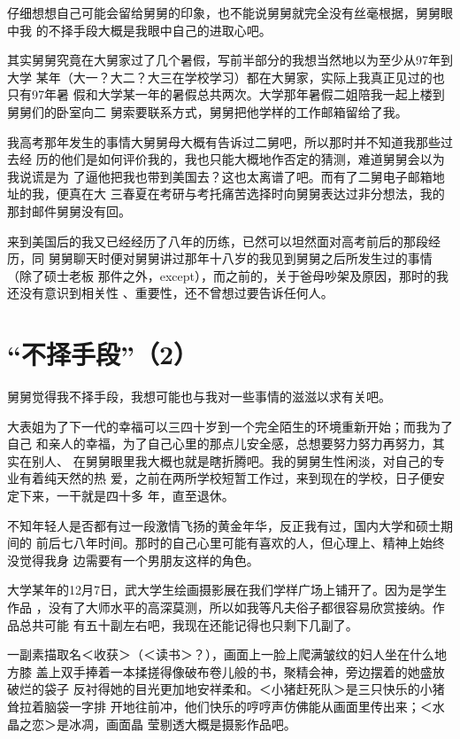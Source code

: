 \documentclass[12pt]{book}
\begin{document}
仔细想想自己可能会留给舅舅的印象，也不能说舅舅就完全没有丝毫根据，舅舅眼中我
的不择手段大概是我眼中自己的进取心吧。

其实舅舅究竟在大舅家过了几个暑假，写前半部分的我想当然地以为至少从97年到大学
某年（大一？大二？大三在学校学习）都在大舅家，实际上我真正见过的也只有97年暑
假和大学某一年的暑假总共两次。大学那年暑假二姐陪我一起上楼到舅舅们的卧室向二
舅索要联系方式，舅舅把他学样的工作邮箱留给了我。

我高考那年发生的事情大舅舅母大概有告诉过二舅吧，所以那时并不知道我那些过去经
历的他们是如何评价我的，我也只能大概地作否定的猜测，难道舅舅会以为我说谎是为
了逼他把我也带到美国去？这也太离谱了吧。而有了二舅电子邮箱地址的我，便真在大
三春夏在考研与考托痛苦选择时向舅舅表达过非分想法，我的那封邮件舅舅没有回。

来到美国后的我又已经经历了八年的历练，已然可以坦然面对高考前后的那段经历，同
舅舅聊天时便对舅舅讲过那年十八岁的我见到舅舅之后所发生过的事情（除了硕士老板
那件之外，except），而之前的，关于爸母吵架及原因，那时的我还没有意识到相关性
、重要性，还不曾想过要告诉任何人。
\section{“不择手段”（2）}
\label{sec-9-88}

舅舅觉得我不择手段，我想可能也与我对一些事情的滋滋以求有关吧。

大表姐为了下一代的幸福可以三四十岁到一个完全陌生的环境重新开始；而我为了自己
和亲人的幸福，为了自己心里的那点儿安全感，总想要努力努力再努力，其实在别人、
在舅舅眼里我大概也就是瞎折腾吧。我的舅舅生性闲淡，对自己的专业有着纯天然的热
爱，之前在两所学校短暂工作过，来到现在的学校，日子便安定下来，一干就是四十多
年，直至退休。

不知年轻人是否都有过一段激情飞扬的黄金年华，反正我有过，国内大学和硕士期间的
前后七八年时间。那时的自己心里可能有喜欢的人，但心理上、精神上始终没觉得我身
边需要有一个男朋友这样的角色。

大学某年的12月7日，武大学生绘画摄影展在我们学样广场上铺开了。因为是学生作品
，没有了大师水平的高深莫测，所以如我等凡夫俗子都很容易欣赏接纳。作品总共可能
有五十副左右吧，我现在还能记得也只剩下几副了。

一副素描取名＜收获＞（＜读书＞？），画面上一脸上爬满皱纹的妇人坐在什么地方膝
盖上双手捧着一本揉搓得像破布卷儿般的书，聚精会神，旁边摆着的她盛放破烂的袋子
反衬得她的目光更加地安祥柔和。＜小猪赶死队＞是三只快乐的小猪耸拉着脑袋一字排
开地往前冲，他们快乐的哼哼声仿佛能从画面里传出来；＜水晶之恋＞是冰凋，画面晶
莹剔透大概是摄影作品吧。
\end{document}
